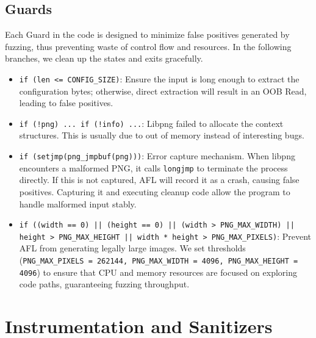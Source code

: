 \documentclass[letterpaper,twocolumn,10pt]{article}
\begin{document}
\subsection{Guards}
Each Guard in the code is designed to minimize false positives generated by fuzzing, thus preventing waste of control flow and resources. In the following branches, we clean up the states and exits gracefully.
\begin{itemize}[leftmargin=*]
    \item \lstinline|if (len <= CONFIG_SIZE)|: Ensure the input is long enough to extract the configuration bytes; otherwise, direct extraction will result in an OOB Read, leading to false positives.
    \item \lstinline|if (!png) ... if (!info) ...|: Libpng failed to allocate the context structures. This is usually due to out of memory instead of interesting bugs. 
    \item \lstinline|if (setjmp(png_jmpbuf(png)))|: Error capture mechanism. When libpng encounters a malformed PNG, it calls \lstinline|longjmp| to terminate the process directly. If this is not captured, AFL will record it as a crash, causing false positives. Capturing it and executing cleanup code allow the program to handle malformed input stably.
    \item \lstinline+if ((width == 0) || (height == 0) || (width > PNG_MAX_WIDTH) || height > PNG_MAX_HEIGHT || width * height > PNG_MAX_PIXELS)+: Prevent AFL from generating legally large images. We set thresholds (\lstinline|PNG_MAX_PIXELS = 262144, PNG_MAX_WIDTH = 4096, PNG_MAX_HEIGHT = 4096|) to ensure that CPU and memory resources are focused on exploring code paths, guaranteeing fuzzing throughput. 
\end{itemize}


\section{Instrumentation and Sanitizers}
\label{sec:q2}


\end{document}
